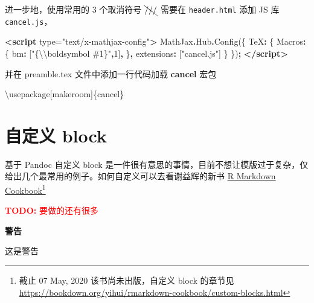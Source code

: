 \documentclass[
  lang=cn,
  11pt,
  scheme=chinese,
  chinesefont=nofont,
  bibstyle=apalike]{elegantbook}
\newenvironment{Shaded}{\begin{snugshade}}{\end{snugshade}}
\newcommand{\AttributeTok}[1]{\textcolor[rgb]{0.77,0.63,0.00}{#1}}
\newcommand{\BuiltInTok}[1]{#1}
\newcommand{\DataTypeTok}[1]{\textcolor[rgb]{0.13,0.29,0.53}{#1}}
\newcommand{\DecValTok}[1]{\textcolor[rgb]{0.00,0.00,0.81}{#1}}
\newcommand{\ExtensionTok}[1]{#1}
\newcommand{\FunctionTok}[1]{\textcolor[rgb]{0.00,0.00,0.00}{#1}}
\newcommand{\KeywordTok}[1]{\textcolor[rgb]{0.13,0.29,0.53}{\textbf{#1}}}
\newcommand{\NormalTok}[1]{#1}
\newcommand{\OperatorTok}[1]{\textcolor[rgb]{0.81,0.36,0.00}{\textbf{#1}}}
\newcommand{\OtherTok}[1]{\textcolor[rgb]{0.56,0.35,0.01}{#1}}
\newcommand{\SpecialCharTok}[1]{\textcolor[rgb]{0.00,0.00,0.00}{#1}}
\newcommand{\StringTok}[1]{\textcolor[rgb]{0.31,0.60,0.02}{#1}}
\begin{document}
进一步地，使用常用的 3 个取消符号 \(\bcancel{///}\) 需要在 \texttt{header.html} 添加 JS 库 \texttt{cancel.js}，

\begin{Shaded}
\begin{Highlighting}[]
\KeywordTok{\textless{}script}\OtherTok{ type=}\StringTok{"text/x{-}mathjax{-}config"}\KeywordTok{\textgreater{}}
\NormalTok{    MathJax}\OperatorTok{.}\AttributeTok{Hub}\OperatorTok{.}\FunctionTok{Config}\NormalTok{(\{}
      \DataTypeTok{TeX}\OperatorTok{:}\NormalTok{ \{}
        \DataTypeTok{Macros}\OperatorTok{:}\NormalTok{ \{}
          \DataTypeTok{bm}\OperatorTok{:}\NormalTok{ [}\StringTok{"\{}\SpecialCharTok{\textbackslash{}\textbackslash{}}\StringTok{boldsymbol \#1\}"}\OperatorTok{,}\DecValTok{1}\NormalTok{]}\OperatorTok{,}
\NormalTok{        \}}\OperatorTok{,}
        \DataTypeTok{extensions}\OperatorTok{:}\NormalTok{ [}\StringTok{"cancel.js"}\NormalTok{]}
\NormalTok{      \}}
\NormalTok{    \})}\OperatorTok{;}
\KeywordTok{\textless{}/script\textgreater{}}
\end{Highlighting}
\end{Shaded}

并在 preamble.tex 文件中添加一行代码加载 \textbf{cancel} 宏包

\begin{Shaded}
\begin{Highlighting}[]
\BuiltInTok{\textbackslash{}usepackage}\NormalTok{[makeroom]\{}\ExtensionTok{cancel}\NormalTok{\}}
\end{Highlighting}
\end{Shaded}

\hypertarget{custom-block}{%
\section{自定义 block}\label{custom-block}}

基于 Pandoc 自定义 block 是一件很有意思的事情，目前不想让模版过于复杂，仅给出几个最常用的例子。如何自定义可以去看谢益辉的新书 \href{https://bookdown.org/yihui/rmarkdown-cookbook/}{R Markdown Cookbook}\footnote{截止 07 May, 2020 该书尚未出版，自定义 block 的章节见 \url{https://bookdown.org/yihui/rmarkdown-cookbook/custom-blocks.html}}

\textcolor{red}{\textbf{TODO: }{要做的还有很多}}

\begin{rmdwarn}\textcolor[RGB]{255,83,59}{\Large\textbf{警告}}

这是警告

\end{rmdwarn}
\end{document}
